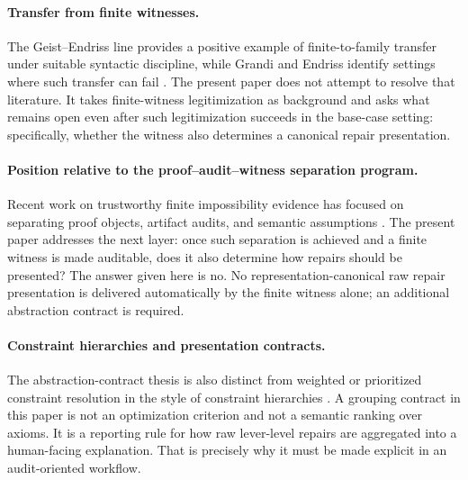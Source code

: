 \paragraph{Transfer from finite witnesses.}
The Geist--Endriss line provides a positive example of finite-to-family transfer under suitable syntactic discipline, while Grandi and Endriss identify settings where such transfer can fail \citep{geist2011automated,grandiendriss2013}.
The present paper does not attempt to resolve that literature.
It takes finite-witness legitimization as background and asks what remains open even after such legitimization succeeds in the base-case setting: specifically, whether the witness also determines a canonical repair presentation.

\paragraph{Position relative to the proof--audit--witness separation program.}
Recent work on trustworthy finite impossibility evidence has focused on separating proof objects, artifact audits, and semantic assumptions \citep{geist2011automated}.
The present paper addresses the next layer: once such separation is achieved and a finite witness is made auditable, does it also determine how repairs should be presented?
The answer given here is no.
No representation-canonical raw repair presentation is delivered automatically by the finite witness alone; an additional abstraction contract is required.

\paragraph{Constraint hierarchies and presentation contracts.}
The abstraction-contract thesis is also distinct from weighted or prioritized constraint resolution in the style of constraint hierarchies \citep{borning1992constraint}.
A grouping contract in this paper is not an optimization criterion and not a semantic ranking over axioms.
It is a reporting rule for how raw lever-level repairs are aggregated into a human-facing explanation.
That is precisely why it must be made explicit in an audit-oriented workflow.
